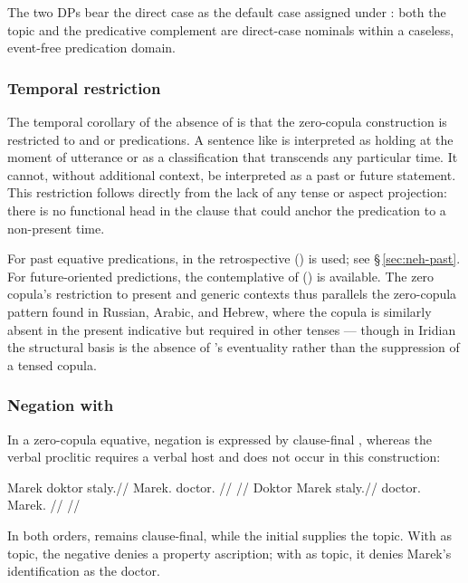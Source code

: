The two DPs bear the direct case as the default case assigned under
: both the topic and the predicative complement are direct-case
nominals within a caseless, event-free predication domain.

\subsubsection{Temporal restriction}

The temporal corollary of the absence of  is that the zero-copula
construction is restricted to  and  or
 predications. A sentence like  is interpreted
as holding at the moment of utterance or as a classification that transcends any
particular time. It cannot, without additional context, be interpreted as a past
or future statement. This restriction follows directly from the lack of any
tense or aspect projection: there is no functional head in the clause that could
anchor the predication to a non-present time.

For past equative predications,  in the retrospective () is
used; see §\,\ref{sec:neh-past}. For future-oriented predictions, the
contemplative of  () is available. The zero copula's
restriction to present and generic contexts thus parallels the zero-copula
pattern found in Russian, Arabic, and Hebrew, where the copula is similarly
absent in the present indicative but required in other tenses --- though in
Iridian the structural basis is the absence of 's eventuality
rather than the suppression of a tensed copula.

\subsubsection{Negation with }

In a zero-copula equative, negation is expressed by clause-final ,
whereas the verbal proclitic  requires a verbal host and does not occur
in this construction:

\pex
\a
\begingl
\gla Marek doktor staly.//
\glb Marek.\Dir{} doctor.\Dir{} \Neg{}//
\glft {}//
\endgl
\a
\begingl
\gla Doktor Marek staly.//
\glb doctor.\Dir{} Marek.\Dir{} \Neg{}//
\glft {}//
\endgl
\xe

\noindent In both orders,  remains clause-final, while the
initial  supplies the topic. With  as topic, the
negative denies a property ascription; with  as topic, it denies
Marek's identification as the doctor.

